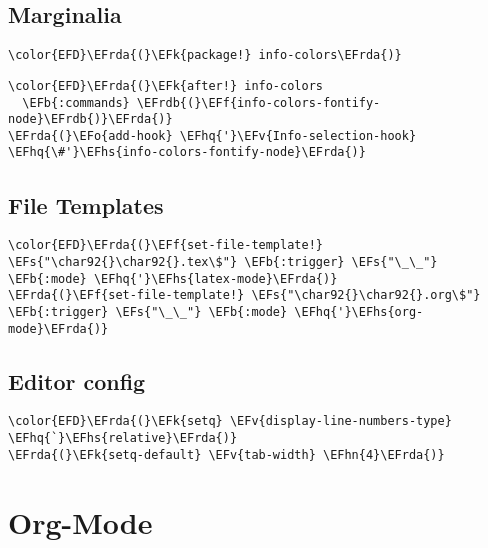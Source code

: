 \documentclass[12pt]{article}
\theoremstyle{plain}%
\theoremstyle{definition}
\theoremstyle{remark}
\newcommand{\EFs}[1]{\textcolor{EFs}{#1}} %
\newcommand{\EFk}[1]{\textcolor{EFk}{#1}} %
\newcommand{\EFb}[1]{\textcolor{EFb}{#1}} %
\newcommand{\EFf}[1]{\textcolor{EFf}{#1}} %
\newcommand{\EFv}[1]{\textcolor{EFv}{#1}} %
\newcommand{\EFo}[1]{\textcolor{EFo}{#1}} %
\newcommand{\EFhn}[1]{\textcolor{EFhn}{\textbf{#1}}} %
\newcommand{\EFhq}[1]{\textcolor{EFhq}{#1}} %
\newcommand{\EFhs}[1]{\textcolor{EFhs}{#1}} %
\newcommand{\EFrda}[1]{\textcolor{EFrda}{#1}} %
\newcommand{\EFrdb}[1]{\textcolor{EFrdb}{#1}} %
\begin{document}
\subsection{Marginalia}
\label{sec:org1b9e1ff}
\begin{Code}
\begin{Verbatim}
\color{EFD}\EFrda{(}\EFk{package!} info-colors\EFrda{)}
\end{Verbatim}
\end{Code}
\begin{Code}
\begin{Verbatim}
\color{EFD}\EFrda{(}\EFk{after!} info-colors
  \EFb{:commands} \EFrdb{(}\EFf{info-colors-fontify-node}\EFrdb{)}\EFrda{)}
\EFrda{(}\EFo{add-hook} \EFhq{'}\EFv{Info-selection-hook} \EFhq{\#'}\EFhs{info-colors-fontify-node}\EFrda{)}
\end{Verbatim}
\end{Code}
\subsection{File Templates}
\label{sec:org4b0ce8f}
\begin{Code}
\begin{Verbatim}
\color{EFD}\EFrda{(}\EFf{set-file-template!} \EFs{"\char92{}\char92{}.tex\$"} \EFb{:trigger} \EFs{"\_\_"} \EFb{:mode} \EFhq{'}\EFhs{latex-mode}\EFrda{)}
\EFrda{(}\EFf{set-file-template!} \EFs{"\char92{}\char92{}.org\$"} \EFb{:trigger} \EFs{"\_\_"} \EFb{:mode} \EFhq{'}\EFhs{org-mode}\EFrda{)}
\end{Verbatim}
\end{Code}
\subsection{Editor config}
\label{sec:orgcffeb99}
\begin{Code}
\begin{Verbatim}
\color{EFD}\EFrda{(}\EFk{setq} \EFv{display-line-numbers-type} \EFhq{`}\EFhs{relative}\EFrda{)}
\EFrda{(}\EFk{setq-default} \EFv{tab-width} \EFhn{4}\EFrda{)}
\end{Verbatim}
\end{Code}
\section{Org-Mode}
\label{sec:org31d32f9}
\end{document}
